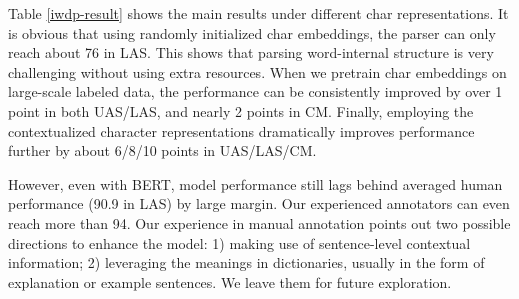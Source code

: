 Table \ref{iwdp-result} shows the main results  %
under different char representations.  
It is obvious that using randomly initialized char embeddings, the parser can only reach about 76 in LAS. This shows that parsing word-internal structure is very challenging without using extra resources. 
When we pretrain char embeddings on large-scale labeled data, the performance can be consistently improved by over 1 point in both UAS/LAS, and nearly 2 points in CM. 
Finally, employing the contextualized character representations dramatically improves performance further by about 6/8/10 points in UAS/LAS/CM. 

However, even with BERT, model performance still lags behind averaged human performance (90.9 in LAS) by large margin.
Our experienced annotators can even reach more than 94. 
Our experience in manual annotation points out two possible directions to enhance the model: 1) making use of sentence-level contextual information; 2) leveraging the meanings in dictionaries, usually in the form of explanation or example sentences. 
We leave them for future exploration. 



